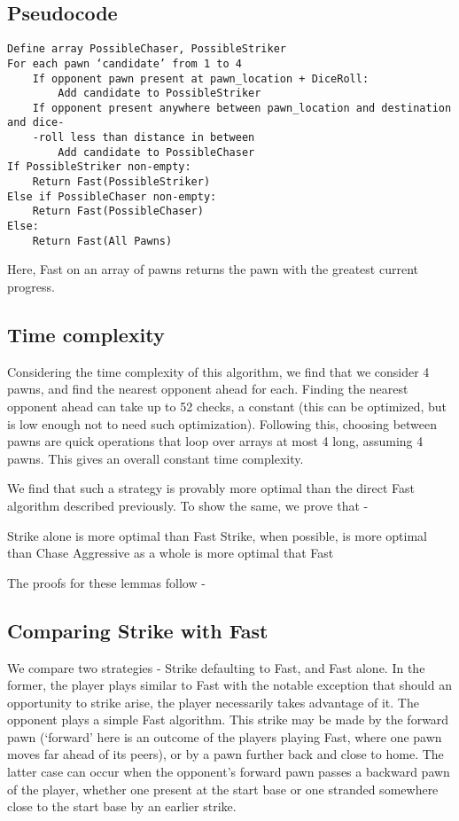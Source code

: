 \documentclass{article} %
\begin{document}
\subsection{Pseudocode}
\begin{verbatim}
Define array PossibleChaser, PossibleStriker
For each pawn ‘candidate’ from 1 to 4
    If opponent pawn present at pawn_location + DiceRoll:
        Add candidate to PossibleStriker
    If opponent present anywhere between pawn_location and destination and dice-
    -roll less than distance in between
        Add candidate to PossibleChaser
If PossibleStriker non-empty:
    Return Fast(PossibleStriker)
Else if PossibleChaser non-empty:
    Return Fast(PossibleChaser)
Else:
    Return Fast(All Pawns)
\end{verbatim}
Here, Fast on an array of pawns returns the pawn with the greatest current progress.

\subsection{Time complexity}

Considering the time complexity of this algorithm, we find that we consider 4 pawns, and find the nearest opponent ahead for each. Finding the nearest opponent ahead can take up to 52 checks, a constant (this can be optimized, but is low enough not to need such optimization). Following this, choosing between pawns are quick operations that loop over arrays at most 4 long, assuming 4 pawns. This gives an overall constant time complexity.

We find that such a strategy is provably more optimal than the direct Fast algorithm described previously. To show the same, we prove that -

Strike alone is more optimal than Fast
Strike, when possible, is more optimal than Chase
Aggressive as a whole is more optimal that Fast

	The proofs for these lemmas follow -


\subsection{Comparing Strike with Fast}
We compare two strategies - Strike defaulting to Fast, and Fast alone. In the former, the player plays similar to Fast with the notable exception that should an opportunity to strike arise, the player necessarily takes advantage of it. The opponent plays a simple Fast algorithm. This strike may be made by the forward pawn (‘forward’ here is an outcome of the players playing Fast, where one pawn moves far ahead of its peers), or by a pawn further back and close to home. The latter case can occur when the opponent’s forward pawn passes a backward pawn of the player, whether one present at the start base or one stranded somewhere close to the start base by an earlier strike.
\end{document}
